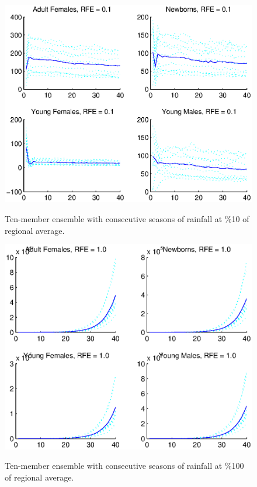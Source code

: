 \documentclass[fleqn, letterpaper]{amsart}
\begin{document}
\begin{figure}
\includegraphics[width=\textwidth]{rgeneral1}
\label{rgeneral1}
\caption{Ten-member ensemble with consecutive seasons of rainfall at \%10 of regional average.}
\end{figure}
\begin{figure}
\includegraphics[width=\textwidth]{rgeneral10}
\label{rgeneral10}
\caption{Ten-member ensemble with consecutive seasons of rainfall at \%100 of regional average.}
\end{figure}
\end{document}
